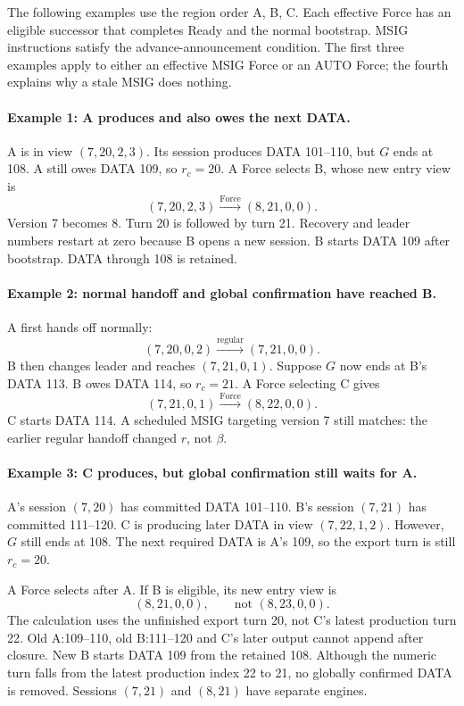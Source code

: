 \documentclass[11pt,a4paper]{article}
\begin{document}
The following examples use the region order A, B, C. Each effective
Force has an eligible successor that completes Ready and the normal
bootstrap. MSIG instructions satisfy the advance-announcement condition.
The first three examples apply to either an effective MSIG Force or
an AUTO Force; the fourth explains why a stale MSIG does nothing.

\paragraph{Example 1: A produces and also owes the next DATA.}
A is in view $(7,20,2,3)$. Its session produces DATA 101--110,
but $G$ ends at 108. A still owes DATA 109, so $r_c=20$.
A Force selects B, whose new entry view is
\[
 (7,20,2,3)\xrightarrow{\text{Force}}(8,21,0,0).
\]
Version 7 becomes 8. Turn 20 is followed by turn 21. Recovery and
leader numbers restart at zero because B opens a new session.
B starts DATA 109 after bootstrap. DATA through 108 is retained.

\paragraph{Example 2: normal handoff and global confirmation have reached B.}
A first hands off normally:
\[
 (7,20,0,2)\xrightarrow{\text{regular}}(7,21,0,0).
\]
B then changes leader and reaches $(7,21,0,1)$. Suppose $G$ now ends
at B's DATA 113. B owes DATA 114, so $r_c=21$. A Force selecting C gives
\[
 (7,21,0,1)\xrightarrow{\text{Force}}(8,22,0,0).
\]
C starts DATA 114. A scheduled MSIG targeting version 7 still matches:
the earlier regular handoff changed $r$, not $\beta$.

\paragraph{Example 3: C produces, but global confirmation still waits for A.}
A's session $(7,20)$ has committed DATA 101--110. B's session
$(7,21)$ has committed 111--120. C is producing later DATA in view
$(7,22,1,2)$. However, $G$ still ends at 108. The next required DATA
is A's 109, so the export turn is still $r_c=20$.

A Force selects after A. If B is eligible, its new entry view is
\[
 (8,21,0,0),\qquad\text{not }(8,23,0,0).
\]
The calculation uses the unfinished export turn 20, not C's latest
production turn 22. Old A:109--110, old B:111--120 and C's later output
cannot append after closure. New B starts DATA 109 from the retained 108.
Although the numeric turn falls from the latest production index 22 to
21, no globally confirmed DATA is removed. Sessions $(7,21)$ and
$(8,21)$ have separate engines.
\end{document}
